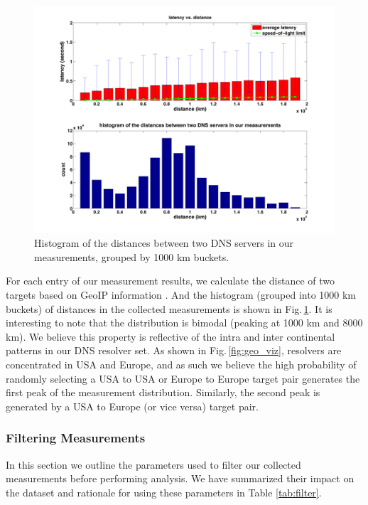 \begin{figure}
  \centering
  \includegraphics[width=\linewidth]{../figs/King_distance_distrbution.pdf}
  \vspace{-1em}
  \caption{Histogram of the distances between two DNS servers in our measurements, grouped by 1000 km buckets.}
  \label{fig:latency_distance_distribution}
\end{figure}

For each entry of our measurement results, we calculate the distance of two targets based on GeoIP information \cite{maxmind}. And the histogram (grouped into 1000 km buckets) of distances in the collected measurements is shown in Fig.\,\ref{fig:latency_distance_distribution}. It is interesting to note that the distribution is bimodal (peaking at 1000 km and 8000 km). We believe this property is reflective of the intra and inter continental patterns in our DNS resolver set. As shown in Fig.\,\ref{fig:geo_viz}, resolvers are concentrated in USA and Europe, and as such we believe the high probability of randomly selecting a USA to USA or Europe to Europe target pair generates the first peak of the measurement distribution. Similarly, the second peak is generated by a USA to Europe (or vice versa) target pair.

\subsubsection{Filtering Measurements}
In this section we outline the parameters used to filter our collected measurements before performing analysis. We have summarized their impact on the dataset and rationale for using these parameters in Table \ref{tab:filter}.

